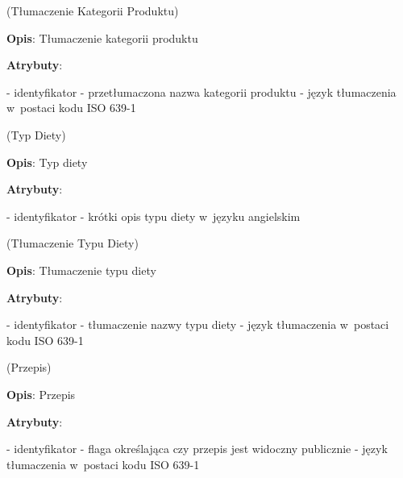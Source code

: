 \begin{enumerate}[label={\textbf{KAT/\protect\threedigits{\theenumi}}}, wide, labelwidth=!, labelindent=0pt, labelsep=0pt, series=reqs]
    \label{kat:ProductCategoryTranslation} (Tłumaczenie Kategorii Produktu)

    \textbf{Opis}: Tłumaczenie kategorii produktu
    \par
    \textbf{Atrybuty}:
    \begin{itemize}[series=atr, wide, align=left, leftmargin=190pt]
        \label{kat:ProductCategoryTranslation:id}- identyfikator
        \label{kat:ProductCategoryTranslation:translation}- przetłumaczona nazwa kategorii produktu
        \label{kat:ProductCategoryTranslation:language}- język tłumaczenia w~postaci kodu ISO 639-1
    \end{itemize}

    \label{kat:DietType} (Typ Diety)

    \textbf{Opis}: Typ diety
    \par
    \textbf{Atrybuty}:
    \begin{itemize}[series=atr, wide, align=left, leftmargin=190pt]
        \label{kat:DietType:id}- identyfikator
        \label{kat:DietType:name}- krótki opis typu diety w~języku angielskim
    \end{itemize}

    \label{kat:DietTypeTranslation} (Tłumaczenie Typu Diety)

    \textbf{Opis}: Tłumaczenie typu diety
    \par
    \textbf{Atrybuty}:
    \begin{itemize}[series=atr, wide, align=left, leftmargin=190pt]
        \label{kat:DietTypeTranslation:id}- identyfikator
        \label{kat:DietTypeTranslation:translation}- tłumaczenie nazwy typu diety
        \label{kat:DietTypeTranslation:language}- język tłumaczenia w~postaci kodu ISO 639-1
    \end{itemize}

    \label{kat:Recipe} (Przepis)

    \textbf{Opis}: Przepis
    \par
    \textbf{Atrybuty}:
    \begin{itemize}[series=atr, wide, align=left, leftmargin=190pt]
        \label{kat:Recipe:id}- identyfikator
        \label{kat:Recipe:isPublic}- flaga określająca czy przepis jest widoczny publicznie
        \label{kat:Recipe:language}- język tłumaczenia w~postaci kodu ISO 639-1
    \end{itemize}


\end{enumerate}
